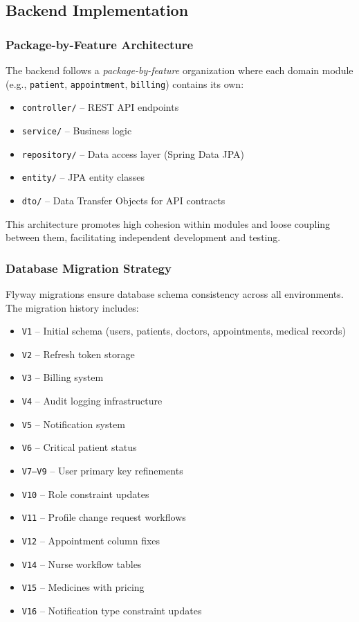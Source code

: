 \documentclass[conference]{IEEEtran}
\begin{document}
\subsection{Backend Implementation}

\subsubsection{Package-by-Feature Architecture}
The backend follows a \textit{package-by-feature} organization where each domain module (e.g., \texttt{patient}, \texttt{appointment}, \texttt{billing}) contains its own:
\begin{itemize}[leftmargin=*]
  \item \texttt{controller/} -- REST API endpoints
  \item \texttt{service/} -- Business logic
  \item \texttt{repository/} -- Data access layer (Spring Data JPA)
  \item \texttt{entity/} -- JPA entity classes
  \item \texttt{dto/} -- Data Transfer Objects for API contracts
\end{itemize}

This architecture promotes high cohesion within modules and loose coupling between them, facilitating independent development and testing.

\subsubsection{Database Migration Strategy}
Flyway migrations ensure database schema consistency across all environments. The migration history includes:
\begin{itemize}[leftmargin=*]
  \item \texttt{V1} -- Initial schema (users, patients, doctors, appointments, medical records)
  \item \texttt{V2} -- Refresh token storage
  \item \texttt{V3} -- Billing system
  \item \texttt{V4} -- Audit logging infrastructure
  \item \texttt{V5} -- Notification system
  \item \texttt{V6} -- Critical patient status
  \item \texttt{V7--V9} -- User primary key refinements
  \item \texttt{V10} -- Role constraint updates
  \item \texttt{V11} -- Profile change request workflows
  \item \texttt{V12} -- Appointment column fixes
  \item \texttt{V14} -- Nurse workflow tables
  \item \texttt{V15} -- Medicines with pricing
  \item \texttt{V16} -- Notification type constraint updates
\end{itemize}
\end{document}
